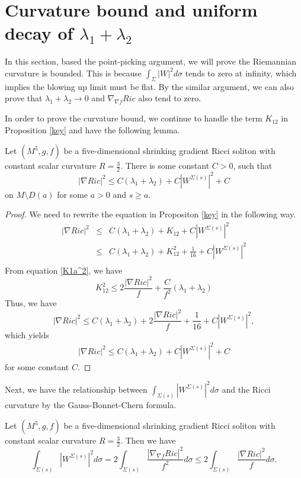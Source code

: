 \documentclass[12pt]{amsart}
\newcommand{\ban}{\begin{eqnarray*}}
\newcommand{\ean}{\end{eqnarray*}}
\begin{document}
	
	\section{Curvature bound and uniform decay of $\lambda_1+\lambda_2$}\label{sec5}
	
	In this section, based the point-picking argument, we will prove the Riemannian curvature is bounded.
	This is because $\int_{\Sigma}|W|^2d\sigma$ tends to zero at infinity, which implies the blowing up limit must be flat. By the similar argument, we can also prove that $\lambda_1+\lambda_2 \rightarrow 0$ and $\nabla_{\nabla f}Ric$ also tend to zero.
	
	\smallskip
	
	In order to prove the curvature bound, we continue to handle the term $K_{12}$ in Proposition \ref{key} and have the following lemma.
	\begin{lem}\label{ricci'}
		Let $(M^5, g, f)$ be a five-dimensional shrinking gradient Ricci soliton with constant scalar curvature $R=\frac{3}{2}$. There is some constant $C>0$, such that
		\[
		|\nabla Ric|^2\leq  C(\lambda_1+\lambda_2)+C|W^{\Sigma(s)}|^2+C
		\]
		on $M\setminus D(a)$ for some $a>0$ and $s\geq a$.	
	\end{lem}
	\begin{proof}
		We need to rewrite the equation in Propositon \ref{key} in the following way.
		\ban
		|\nabla Ric|^2&\leq& C(\lambda_1+\lambda_2)+K_{12}+C|W^{\Sigma(s)}|^2\\
		&\leq& C(\lambda_1+\lambda_2)+K_{12}^2+\frac{1}{16}+C|W^{\Sigma(s)}|^2\\
		\ean
		From equation \eqref{K1a^2}, we have
		\[
		K_{12}^2\leq2\frac{|\nabla Ric|^2}{f}+\frac{C}{f^2}(\lambda_1+\lambda_2)
		\]
		Thus, we have
		\[
		|\nabla Ric|^2\leq C(\lambda_1+\lambda_2)+2\frac{|\nabla Ric|^2}{f}+\frac{1}{16}+C|W^{\Sigma(s)}|^2,
		\]
		which yields
		\ban
		|\nabla Ric|^2\leq  C(\lambda_1+\lambda_2)+C|W^{\Sigma(s)}|^2+C
		\ean
		for some constant $C$.
	\end{proof}
	
	Next, we have the relationship between $\int_{\Sigma(s)}{|W^{\Sigma(s)}|^2}d\sigma$ and the Ricci curvature by the Gauss-Bonnet-Chern formula.	
\begin{lem}\label{gbc}
	Let $(M^5, g, f)$ be a five-dimensional shrinking gradient Ricci soliton with constant scalar curvature $R=\frac{3}{2}$. Then we have
	\begin{equation}
		\int_{\Sigma(s)}{|W^{\Sigma(s)}|^2}d\sigma
		=2\int_{\Sigma(s)}{\frac{|\nabla_{\nabla f} Ric|^2}{f^2}}d\sigma\leq2\int_{\Sigma(s)}{\frac{|\nabla Ric|^2}{f}}d\sigma.
	\end{equation}	
\end{lem}
\end{document}

